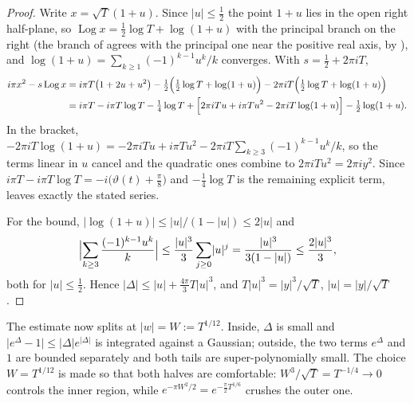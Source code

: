 \begin{proof}
\leanok
{}
Write $x=\sqrt T(1+u)$.  Since $\lvert u\rvert\le\tfrac12$ the point $1+u$ lies in the open right
half-plane, so $\operatorname{Log}x=\tfrac12\log T+\log(1+u)$ with the principal branch on the
right (the branch of  agrees with the principal one near the positive real
axis, by ), and $\log(1+u)=\sum_{k\ge1}(-1)^{k-1}u^{k}/k$ converges.
With $s=\tfrac12+2\pi iT$,
\begin{align*}
  i\pi x^{2}-s\operatorname{Log}x
  &=i\pi T\bigl(1+2u+u^{2}\bigr)-\tfrac12\Bigl(\tfrac12\log T+\log(1+u)\Bigr)
    -2\pi iT\Bigl(\tfrac12\log T+\log(1+u)\Bigr)\\
  &=i\pi T-i\pi T\log T-\tfrac14\log T
    +\Bigl[2\pi iTu+i\pi Tu^{2}-2\pi iT\log(1+u)\Bigr]-\tfrac12\log(1+u).
\end{align*}
In the bracket, $-2\pi iT\log(1+u)=-2\pi iTu+i\pi Tu^{2}-2\pi iT\sum_{k\ge3}(-1)^{k-1}u^{k}/k$,
so the terms linear in $u$ cancel and the quadratic ones combine to
$2\pi iTu^{2}=2\pi iy^{2}$.  Since $i\pi T-i\pi T\log T=-i\bigl(\vartheta(t)+\tfrac\pi8\bigr)$
and $-\tfrac14\log T$ is the remaining explicit term,  leaves exactly
the stated series.

For the bound, $\lvert\log(1+u)\rvert\le\lvert u\rvert/(1-\lvert u\rvert)\le2\lvert u\rvert$ and
\[
  \Bigl\lvert\sum_{k\ge3}\frac{(-1)^{k-1}u^{k}}{k}\Bigr\rvert
  \le\frac{\lvert u\rvert^{3}}{3}\sum_{j\ge0}\lvert u\rvert^{j}
  =\frac{\lvert u\rvert^{3}}{3(1-\lvert u\rvert)}\le\frac{2\lvert u\rvert^{3}}{3},
\]
both for $\lvert u\rvert\le\tfrac12$.  Hence
$\lvert\Delta\rvert\le\lvert u\rvert+\tfrac{4\pi}{3}T\lvert u\rvert^{3}$, and
$T\lvert u\rvert^{3}=\lvert y\rvert^{3}/\sqrt T$, $\lvert u\rvert=\lvert y\rvert/\sqrt T$.
\end{proof}

The estimate now splits at $\lvert w\rvert=W:=T^{1/12}$.  Inside, $\Delta$ is small and
$\lvert e^{\Delta}-1\rvert\le\lvert\Delta\rvert e^{\lvert\Delta\rvert}$ is integrated against a
Gaussian; outside, the two terms $e^{\Delta}$ and $1$ are bounded separately and both tails are
super-polynomially small.  The choice $W=T^{1/12}$ is made so that both halves are comfortable:
$W^{3}/\sqrt T=T^{-1/4}\to0$ controls the inner region, while $e^{-\pi W^{2}/2}=e^{-\frac\pi2T^{1/6}}$
crushes the outer one.


